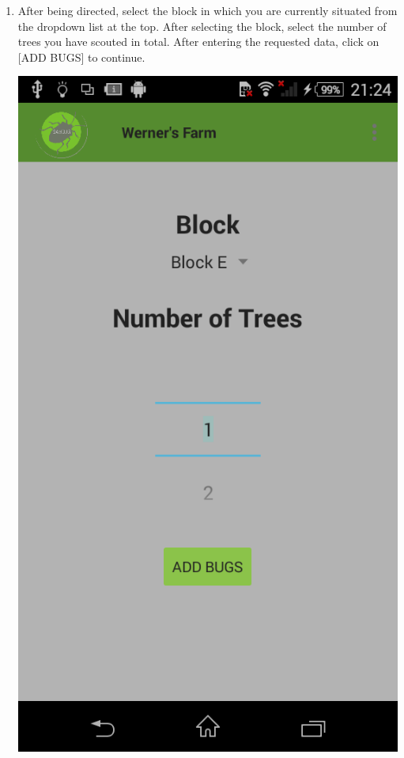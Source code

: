 \documentclass[11pt,a4paper,titlepage]{article}
\begin{document}
\begin{enumerate}
	\item After being directed, select the block in which you are currently situated from the dropdown list at the top. After selecting the block, select the number of trees you have scouted in total. After entering the requested data, click on [ADD BUGS] to continue.
\begin{center}
				\includegraphics[scale=0.3]{enterdatainitial}
			\end{center}



\end{enumerate}
\end{document}
